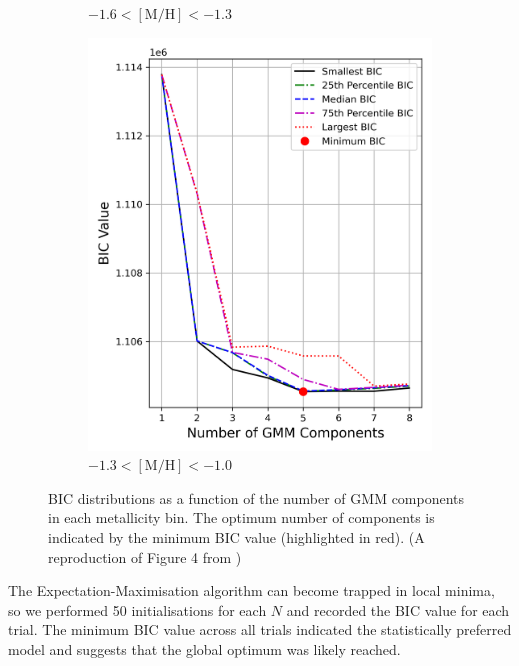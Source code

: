 \documentclass[a4paper,12pt]{article}
\begin{document}
\begin{figure}[h]
\begin{subfigure}[t]{0.23\textwidth}
        \caption{$-1.6 < \mathrm{[M/H]} < -1.3$}
    \end{subfigure}
    \hfill
    \begin{subfigure}[t]{0.23\textwidth}
        \centering
        \includegraphics[width=\linewidth]{../figures/bic_mp2.png}
        \caption{$-1.3 < \mathrm{[M/H]} < -1.0$}
    \end{subfigure}

    \caption{BIC distributions as a function of the number of GMM components in each metallicity bin. 
    The optimum number of components is indicated by the minimum BIC value (highlighted in red).
    (A reproduction of Figure 4 from \citet{zhang2024existencemetalpoordiscmilky})}
    \label{fig:bic_vs_n_components}
\end{figure}


The Expectation-Maximisation algorithm can become trapped in local minima, so we performed 50 initialisations 
for each $N$ and recorded the BIC value for each trial. The minimum BIC value across all trials indicated 
the statistically preferred model and suggests that the global optimum was likely reached. 
\end{document}
